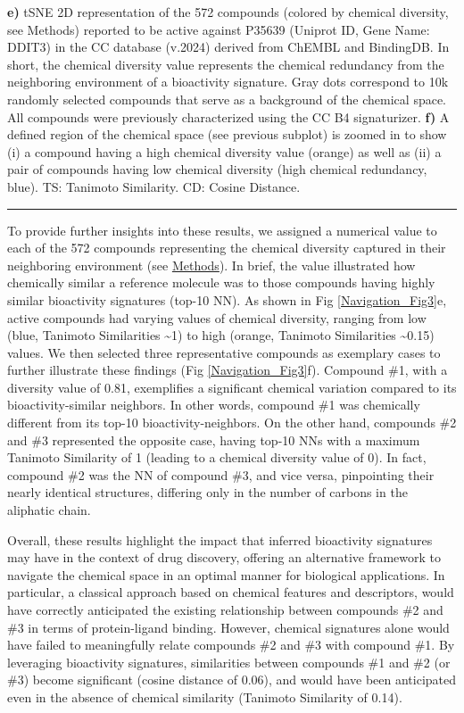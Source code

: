 \begin{Figure_modified}
{    \textbf{e)} tSNE 2D representation of the 572 compounds (colored by chemical diversity, see Methods) reported to be active against P35639 (Uniprot ID, Gene Name: DDIT3) in the CC database (v.2024) derived from ChEMBL and BindingDB. In short, the chemical diversity value represents the chemical redundancy from the neighboring environment of a bioactivity signature. Gray dots correspond to 10k randomly selected compounds that serve as a background of the chemical space. All compounds were previously characterized using the CC B4 signaturizer\cite{bertoni_bioactivity_2021}.
    \textbf{f)} A defined region of the chemical space (see previous subplot) is zoomed in to show (i) a compound having a high chemical diversity value (orange) as well as (ii) a pair of compounds having low chemical diversity (high chemical redundancy, blue). TS: Tanimoto Similarity. CD: Cosine Distance. 
}
  \vspace{-5mm}
  \rule[0ex]{\textwidth}{0.5pt}
  \vspace{-9mm}
  \label{Navigation_Fig3}
\end{Figure_modified}


To provide further insights into these results, we assigned a numerical value to each of the 572 compounds representing the chemical diversity captured in their neighboring environment (see \hyperref[Navigation_Methods]{Methods}). In brief, the value illustrated how chemically similar a reference molecule was to those compounds having highly similar bioactivity signatures (top-10 NN). As shown in Fig \ref{Navigation_Fig3}e, active compounds had varying values of chemical diversity, ranging from low (blue, Tanimoto Similarities \textasciitilde 1) to high (orange, Tanimoto Similarities \textasciitilde 0.15) values. We then selected three representative compounds as exemplary cases to further illustrate these findings (Fig \ref{Navigation_Fig3}f). Compound \#1, with a diversity value of 0.81, exemplifies a significant chemical variation compared to its bioactivity-similar neighbors. In other words, compound \#1 was chemically different from its top-10 bioactivity-neighbors. On the other hand, compounds \#2 and \#3 represented the opposite case, having top-10 NNs with a maximum Tanimoto Similarity of 1 (leading to a chemical diversity value of 0). In fact, compound \#2 was the NN of compound \#3, and vice versa, pinpointing their nearly identical structures, differing only in the number of carbons in the aliphatic chain. 

Overall, these results highlight the impact that inferred bioactivity signatures may have in the context of drug discovery, offering an alternative framework to navigate the chemical space in an optimal manner for biological applications. In particular, a classical approach based on chemical features and descriptors, would have correctly anticipated the existing relationship between compounds \#2 and \#3 in terms of protein-ligand binding. However, chemical signatures alone would have failed to meaningfully relate compounds \#2 and \#3 with compound \#1. By leveraging bioactivity signatures, similarities between compounds \#1 and \#2 (or \#3) become significant (cosine distance of 0.06), and would have been anticipated even in the absence of chemical similarity (Tanimoto Similarity of 0.14). 
